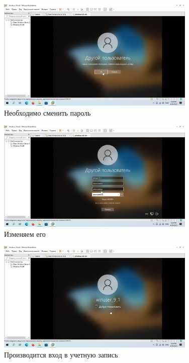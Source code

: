 \documentclass[a4paper]{article}
\begin{document}
  \begin{figure}[H]
    \centering
    \includegraphics[width=0.85\textwidth]{Screenshot_112}
    \caption{Необходимо сменить пароль}
    \label{img:112}
  \end{figure}

  \begin{figure}[H]
    \centering
    \includegraphics[width=0.85\textwidth]{Screenshot_113}
    \caption{Изменяем его}
    \label{img:113}
  \end{figure}

  \begin{figure}[H]
    \centering
    \includegraphics[width=0.85\textwidth]{Screenshot_114}
    \caption{Производится вход в учетную запись}
    \label{img:114}
  \end{figure}
\end{document}

